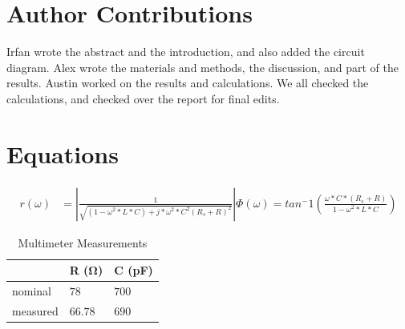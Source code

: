 \documentclass[10pt,twocolumn]{article}
\begin{document}
\section{Author Contributions}

Irfan wrote the abstract and the introduction, and also added the circuit diagram. Alex wrote the materials and methods, the discussion, and part of the results. Austin worked on the results and calculations. We all checked the calculations, and checked over the report for final edits.

\section{Equations}

\begin{align*}
	 r(\omega) &= |\frac{1}{\sqrt{\left(1 - \omega^2*L*C\right) + j*\omega^2*C^2\left(R_{s}+R\right)^2}}|
	 
	 \Phi(\omega) = tan^-1(\frac{\omega*C*\left(R_{s}+R\right)}{1-\omega^2*L*C})
\end{align*}

\begin{table}[bt]
	\begin{tabularx}{1\linewidth}{ lXX }
		\hline
		 & \textbf{R (Ω)} & \textbf{C (pF)} \\
		\hline
		nominal & $78$ & $700$ \\
		measured & $66.78$ & $690$ \\
		\hline
	\end{tabularx}
	\caption{Multimeter Measurements}
	\label{tab:Tab1}
\end{table}
\end{document}
